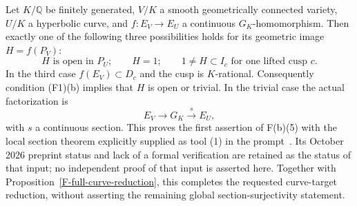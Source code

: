 \begin{proposition}
\label{F-local-dichotomy}
Let $K/\mathbb Q$ be finitely generated, $V/K$ a smooth
geometrically connected variety, $U/K$ a hyperbolic curve,
and $f:E_V\to E_U$ a
continuous $G_K$-homomorphism. Then exactly one of the following
three possibilities holds for its geometric image $H=f(P_V)$:
\[
 H\text{ is open in }P_U;\qquad H=1;\qquad
 1\ne H\subset I_c\text{ for one lifted cusp }c.
\]
In the third case $f(E_V)\subset D_c$ and the cusp is
$K$-rational. Consequently condition (F1)(b) implies that $H$
is open or trivial. In the trivial case the actual factorization
is
\[
 E_V\longrightarrow G_K\xrightarrow{\,s\,}E_U,
\]
with $s$ a continuous section. This proves the first assertion
of F(b)(5) with the local section theorem explicitly supplied
as tool (1) in the prompt~\cite{B_OpenAIPadic}. Its October
2026 preprint status
and lack of a formal verification are retained as the status
of that input; no independent proof of that input is asserted
here. Together with Proposition~\ref{F-full-curve-reduction},
this completes the requested curve-target reduction, without
asserting the remaining global section-surjectivity statement.
\end{proposition}
